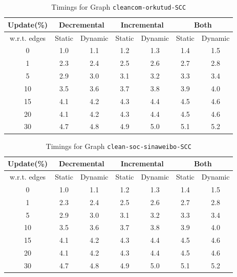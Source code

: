 \begin{table}[H]
    \centering
    \caption{Timings for Graph \texttt{cleancom-orkutud-SCC} }
    \begin{tabular}{|c|c|c|c|c|c|c|}
        \hline
        \textbf{Update(\%)} & \multicolumn{2}{c|}{\textbf{Decremental}} & \multicolumn{2}{c|}{\textbf{Incremental}} & \multicolumn{2}{c|}{\textbf{Both}} \\
        \hline
        w.r.t. edges & Static &  Dynamic & Static & Dynamic & Static & Dynamic \\
        \hline
        0 & 1.0 & 1.1 & 1.2 & 1.3 & 1.4 & 1.5 \\
        1 & 2.3 & 2.4 & 2.5 & 2.6 & 2.7 & 2.8 \\
        5 & 2.9 & 3.0 & 3.1 & 3.2 & 3.3 & 3.4 \\
        10 & 3.5 & 3.6 & 3.7 & 3.8 & 3.9 & 4.0 \\
        15 & 4.1 & 4.2 & 4.3 & 4.4 & 4.5 & 4.6 \\
        20 & 4.1 & 4.2 & 4.3 & 4.4 & 4.5 & 4.6 \\
        30 & 4.7 & 4.8 & 4.9 & 5.0 & 5.1 & 5.2 \\
        \hline
    \end{tabular}
    \label{tab:timed_results_g1}
\end{table}

\begin{table}[H]
    \centering
    \caption{Timings for Graph \texttt{clean-soc-sinaweibo-SCC} }
    \begin{tabular}{|c|c|c|c|c|c|c|}
        \hline
        \textbf{Update(\%)} & \multicolumn{2}{c|}{\textbf{Decremental}} & \multicolumn{2}{c|}{\textbf{Incremental}} & \multicolumn{2}{c|}{\textbf{Both}} \\
        \hline
        w.r.t. edges & Static &  Dynamic & Static & Dynamic & Static & Dynamic \\
        \hline
        0 & 1.0 & 1.1 & 1.2 & 1.3 & 1.4 & 1.5 \\
        1 & 2.3 & 2.4 & 2.5 & 2.6 & 2.7 & 2.8 \\
        5 & 2.9 & 3.0 & 3.1 & 3.2 & 3.3 & 3.4 \\
        10 & 3.5 & 3.6 & 3.7 & 3.8 & 3.9 & 4.0 \\
        15 & 4.1 & 4.2 & 4.3 & 4.4 & 4.5 & 4.6 \\
        20 & 4.1 & 4.2 & 4.3 & 4.4 & 4.5 & 4.6 \\
        30 & 4.7 & 4.8 & 4.9 & 5.0 & 5.1 & 5.2 \\
        \hline
    \end{tabular}
    \label{tab:timed_results_g2}
\end{table}

